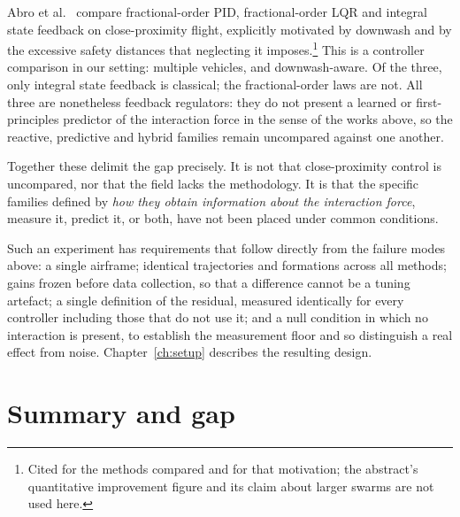 Abro et al.~\cite{abro2025fractional} compare fractional-order PID, fractional-order LQR and
integral state feedback on close-proximity flight, explicitly motivated by downwash and by the
excessive safety distances that neglecting it imposes.\footnote{Cited for the methods compared and
for that motivation; the abstract's quantitative improvement figure and its claim about larger
swarms are not used here.} This is a controller comparison in our setting: multiple vehicles, and
downwash-aware. Of the three, only integral state feedback is classical; the fractional-order laws
are not. All three are nonetheless feedback regulators: they do not present a learned or
first-principles predictor of the interaction force in the sense of the works above, so the
reactive, predictive and hybrid families remain uncompared against one another.

Together these delimit the gap precisely. It is not that close-proximity control is uncompared, nor
that the field lacks the methodology. It is that the specific families defined by \emph{how they
obtain information about the interaction force}, measure it, predict it, or both, have not
been placed under common conditions.

Such an experiment has requirements that follow directly from the failure modes above: a single
airframe; identical trajectories and formations across all methods; gains frozen before data
collection, so that a difference cannot be a tuning artefact; a single definition
of the residual, measured identically for every controller
including those that do not use it; and a null condition in which no interaction is present, to
establish the measurement floor and so distinguish a real effect from noise. Chapter~\ref{ch:setup}
describes the resulting design.

\section{Summary and gap}
\label{sec:rw-gap}


